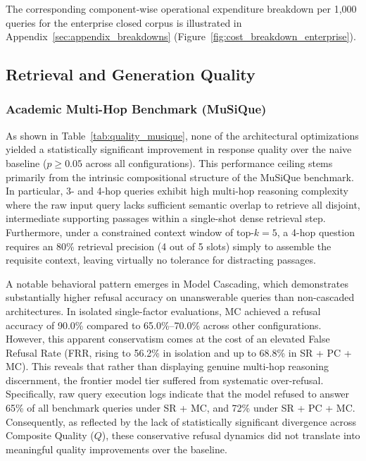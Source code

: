 The corresponding component-wise operational expenditure breakdown per 1,000 queries for the enterprise closed corpus is illustrated in Appendix~\ref{sec:appendix_breakdowns} (Figure~\ref{fig:cost_breakdown_enterprise}).

\FloatBarrier
\subsection{Retrieval and Generation Quality}
\label{subsec:results_quality}

\subsubsection{Academic Multi-Hop Benchmark (MuSiQue)}
\label{subsubsec:quality_musique}

As shown in Table~\ref{tab:quality_musique}, none of the architectural optimizations yielded a statistically significant improvement in response quality over the naive baseline ($p \ge 0.05$ across all configurations). This performance ceiling stems primarily from the intrinsic compositional structure of the MuSiQue benchmark. In particular, 3- and 4-hop queries exhibit high multi-hop reasoning complexity where the raw input query lacks sufficient semantic overlap to retrieve all disjoint, intermediate supporting passages within a single-shot dense retrieval step. Furthermore, under a constrained context window of $\text{top-}k = 5$, a 4-hop question requires an 80\% retrieval precision (4 out of 5 slots) simply to assemble the requisite context, leaving virtually no tolerance for distracting passages. 



A notable behavioral pattern emerges in Model Cascading, which demonstrates substantially higher refusal accuracy on unanswerable queries than non-cascaded architectures. In isolated single-factor evaluations, MC achieved a refusal accuracy of 90.0\% compared to 65.0\%--70.0\% across other configurations. However, this apparent conservatism comes at the cost of an elevated False Refusal Rate (FRR, rising to 56.2\% in isolation and up to 68.8\% in SR + PC + MC). This reveals that rather than displaying genuine multi-hop reasoning discernment, the frontier model tier suffered from systematic over-refusal. Specifically, raw query execution logs indicate that the model refused to answer 65\% of all benchmark queries under SR + MC, and 72\% under SR + PC + MC. Consequently, as reflected by the lack of statistically significant divergence across Composite Quality ($Q$), these conservative refusal dynamics did not translate into meaningful quality improvements over the baseline.

